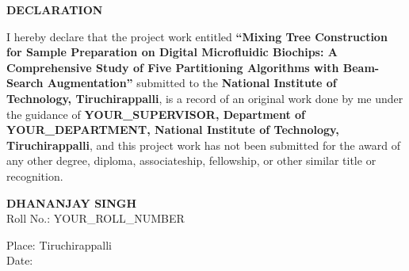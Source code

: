 \begin{center}
\textbf{\Large DECLARATION}
\end{center}

\vspace{1cm}

I hereby declare that the project work entitled \textbf{``Mixing Tree Construction for Sample Preparation on Digital Microfluidic Biochips: A Comprehensive Study of Five Partitioning Algorithms with Beam-Search Augmentation''} submitted to the \textbf{National Institute of Technology, Tiruchirappalli}, is a record of an original work done by me under the guidance of \textbf{YOUR\_SUPERVISOR, Department of YOUR\_DEPARTMENT, National Institute of Technology, Tiruchirappalli}, and this project work has not been submitted for the award of any other degree, diploma, associateship, fellowship, or other similar title or recognition.

\vspace{3cm}

\begin{flushright}
\textbf{DHANANJAY SINGH} \\
Roll No.: YOUR\_ROLL\_NUMBER
\end{flushright}

\vspace{1cm}

Place: Tiruchirappalli \\
Date:
